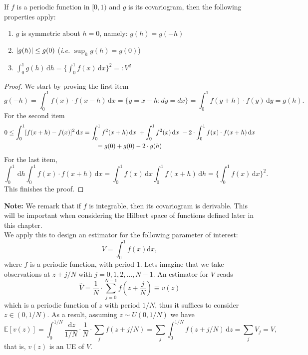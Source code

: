 \begin{Prop}
    If $f$ is a periodic function in $[0,1)$ and $g$ is its covariogram, then the following properties apply:
    \begin{enumerate}
        \item $g$ is symmetric about $h=0$, namely: $g(h) = g(-h)$
        \item $\lvert g(h)\rvert \leq g(0)$ (\textit{i.e.} $\sup_{h}{g(h)} = g(0)$)
        \item $\int_0^1 g(h) \,\mathrm{d}h = \Bigg\{ \int_0^1 f(x) \,\mathrm{d}x \Bigg\}^2 =: V^2$
    \end{enumerate}
\end{Prop}
\begin{proof} 
We start by proving the first item
$$ g(-h) = \int_0^1 f(x) \cdot f(x-h) \,\mathrm{d}x =\{ y=x-h; dy=dx \}= \int_0^1 f(y+h) \cdot f(y) \,\mathrm{d}y = g(h).$$
For the second item
\begin{multline*}
        0 \leq \int_0^1 [ f(x+h) - f(x) ]^2 \,\mathrm{d}x = \int_0^1 f^2(x+h) \,\mathrm{d}x \hspace{1mm} + \int_0^1 f^2(x) \,\mathrm{d}x \hspace{1mm} - 2\cdot \int_0^1 f(x) \cdot f(x+h) \,\mathrm{d}x \\
        = g(0) + g(0) -2\cdot g(h)
    \end{multline*} 
For the last item, 
$$ \int_0^1 \,\mathrm{d}h \int_0^1 f(x) \cdot f(x+h) \,\mathrm{d}x = \int_0^1 f(x) \,\mathrm{d}x \int_0^1 f(x+h) \,\mathrm{d}h = \Bigg\{ \int_0^1 f(x) \,\mathrm{d}x \Bigg\}^2.$$
This finishes the proof.
\end{proof}

\vspace{2mm}

\textbf{Note:} We remark that if $f$ is integrable, then its covariogram is derivable. This will be important when considering the Hilbert space of functions defined later in this chapter.\\%

We apply this to design an estimator for the following parameter of interest:
\begin{equation*}
    V = \int_0^1 f(x) \mathrm{d}x,
\end{equation*}
where $f$ is a periodic function, with period $1$.
Lets imagine that we take observations at $z+j/N$ with $j=0,1,2,\ldots, N-1$. An estimator for $V$ reads
\begin{equation*}
    \widehat{V} = \frac{1}{N} \cdot \sum_{j=0}^{N-1} f\left(z+\frac{j}{N}\right) \equiv v(z)
\end{equation*}
which is a periodic function of $z$ with period $1/N$, thus it suffices to consider $z\in (0,1/N)$. As a result, assuming $z \sim U(0,1/N)$ we have
\begin{equation*}
    \mathbb{E}[v(z)] = \int_0^{1/N} \frac{\,\mathrm{d}z}{1/N} \cdot \frac{1}{N}\cdot \sum_j f(z+j/N) = \sum_j \int_0^{1/N} f(z+j/N) \,\mathrm{d}z = \sum_j V_j = V,
\end{equation*}
that is, $v(z)$ is an UE of $V$.\\

